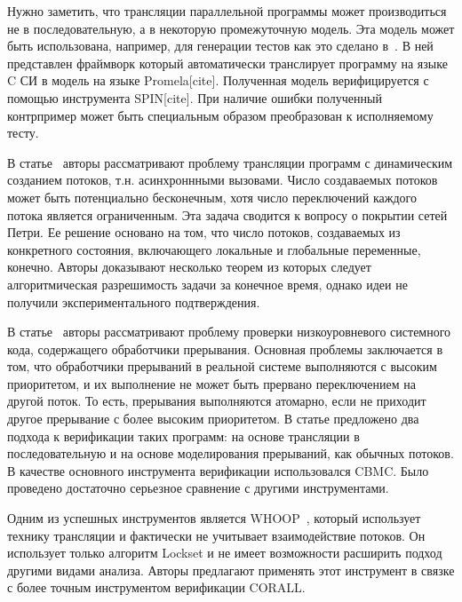Нужно заметить, что трансляции параллельной программы может производиться не в последовательную, а в некоторую промежуточную модель.
Эта модель может быть использована, например, для генерации тестов как это сделано в~\cite{KIM200921}.
В ней представлен фраймворк который автоматически транслирует программу на языке C СИ в модель на языке Promela[cite].
Полученная модель верифицируется с помощью инструмента SPIN[cite]. При наличие ошибки полученный контрпример может быть специальным образом преобразован к исполняемому тесту.

В статье~\cite{Atig:2009} авторы рассматривают проблему трансляции программ с динамическим созданием потоков, т.н. асинхроннными вызовами.
Число создаваемых потоков может быть потенциально бесконечным, хотя число переключений каждого потока является ограниченным.
Эта задача сводится к вопросу о покрытии сетей Петри. Ее решение основано на том, что число потоков, создаваемых из конкретного состояния, включающего локальные и глобальные переменные, конечно.
Авторы доказывают несколько теорем из которых следует алгоритмическая разрешимость задачи за конечное время, однако идеи не получили экспериментального подтверждения.

В статье~\cite{Liang:2017} авторы рассматривают проблему проверки низкоуровневого системного кода, содержащего обработчики прерывания.
Основная проблемы заключается в том, что обработчики прерываний в реальной системе выполняются с высоким приоритетом, и их выполнение не может быть прервано переключением на другой поток.
То есть, прерывания выполняются атомарно, если не приходит другое прерывание с более высоким приоритетом.
В статье предложено два подхода к верификации таких программ: на основе трансляции в последовательную и на основе моделирования прерываний, как обычных потоков.
В качестве основного инструмента верификации использовался CBMC.
Было проведено достаточно серьезное сравнение с другими инструментами.

Одним из успешных инструментов является WHOOP~\cite{WHOOP}, который использует технику трансляции и фактически не учитывает взаимодействие потоков.
Он использует только алгоритм Lockset и не имеет возможности расширить подход другими видами анализа.
Авторы предлагают применять этот инструмент в связке с более точным инструментом верификации CORALL. 


